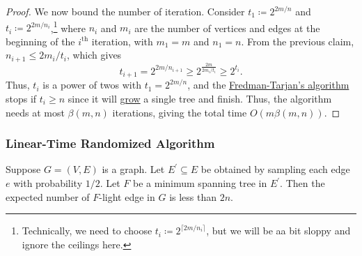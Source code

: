 \begin{proof}
	We now bound the number of iteration. Consider \(t_1 \coloneqq 2^{2m / n}\) and \(t_i \coloneqq 2^{2m / n_i}\),\footnote{Technically, we need to choose \(t_i \coloneqq 2^{\lceil 2m / n_i \rceil }\), but we will be aa bit sloppy and ignore the ceilings here.} where \(n_i\) and \(m_i\) are the number of vertices and edges at the beginning of the \(i^{\text{th} }\) iteration, with \(m_1 = m\) and \(n_1 = n\). From the previous claim, \(n_{i+1} \leq 2m_i / t_i\), which gives
	\[
		t_{i+1}
		= 2^{2m / n_{i+1}}
		\geq 2^{\frac{2m}{2m_i / t_i}}
		\geq 2^{t_i}.
	\]
	Thus, \(t_i\) is a power of twos with \(t_1 = 2^{2m / n}\), and the \hyperref[algo:Fredman-Tarjan]{Fredman-Tarjan's algorithm} stops if \(t_i \geq n\) since it will \hyperref[algo:Fredman-Tarjan-I]{grow} a single tree and finish. Thus, the algorithm needs at most \(\beta (m, n)\) iterations, giving the total time \(O(m \beta (m, n))\).
\end{proof}

\subsubsection{Linear-Time Randomized Algorithm}

\begin{lemma}\label{lma:sampling}
	Suppose \(G=(V, E)\) is a graph. Let \(E^{\prime} \subseteq E\) be obtained by sampling each edge \(e\) with probability \(1 / 2\). Let \(F\) be a minimum spanning tree in \(E^{\prime} \). Then the expected number of \(F\)-light edge in \(G\) is less than \(2n\).
\end{lemma}